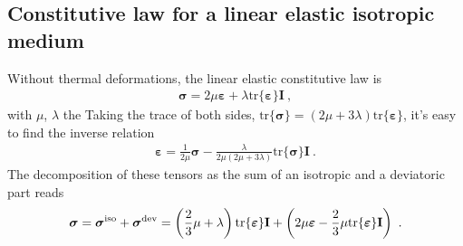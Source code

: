 \documentclass[letterpaper,10pt,english]{jupyterBook}
\begin{document}
\subsection{Constitutive law for a linear elastic isotropic medium}
\label{\detokenize{ch/solids/plates-shells/stress-strain-state:constitutive-law-for-a-linear-elastic-isotropic-medium}}\label{\detokenize{ch/solids/plates-shells/stress-strain-state:solid-mechanics-small-displacements-plates-shells-stress-strain-state-linear-elastic}}
\sphinxAtStartPar
Without thermal deformations, the linear elastic constitutive law is
\begin{equation*}
\begin{split}\boldsymbol\sigma = 2 \mu \boldsymbol\varepsilon + \lambda \text{tr}\{ \boldsymbol\varepsilon \} \mathbf{I} \ ,\end{split}
\end{equation*}
\sphinxAtStartPar
with \(\mu\), \(\lambda\) the  Taking the trace of both sides, \(\text{tr}\{ \boldsymbol\sigma \} = \left( 2 \mu + 3 \lambda \right) \text{tr}\{ \boldsymbol\varepsilon \}\), it’s easy to find the inverse relation
\begin{equation*}
\begin{split}\boldsymbol\varepsilon = \frac{1}{2 \mu} \boldsymbol{\sigma} - \frac{\lambda}{2 \mu ( 2 \mu + 3 \lambda )} \text{tr}\{ \boldsymbol\sigma \} \mathbf{I} \ .\end{split}
\end{equation*}
\sphinxAtStartPar
The decomposition of these tensors as the sum of an isotropic and a deviatoric part reads
\begin{equation*}
\begin{split}\boldsymbol\sigma = \boldsymbol\sigma^{\rm iso} + \boldsymbol\sigma^{\rm dev} = \left( \frac{2}{3} \mu + \lambda \right) \text{tr} \{ \boldsymbol{\varepsilon} \} \mathbf{I} + \left( 2 \mu \boldsymbol{\varepsilon} - \frac{2}{3} \mu \text{tr}\{ \boldsymbol{\varepsilon} \} \mathbf{I} \right) \ .\end{split}
\end{equation*}
\end{document}
